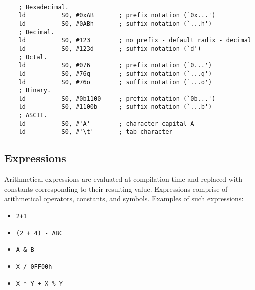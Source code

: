         ~\\
        \verb"    ; Hexadecimal."\\
        \verb"    ld          S0, #0xAB       ; prefix notation (`0x...')"\\
        \verb"    ld          S0, #0ABh       ; suffix notation (`...h')"\\
        \verb"    ; Decimal."\\
        \verb"    ld          S0, #123        ; no prefix - default radix - decimal"\\
        \verb"    ld          S0, #123d       ; suffix notation (`d')"\\
        \verb"    ; Octal."\\
        \verb"    ld          S0, #076        ; prefix notation (`0...')"\\
        \verb"    ld          S0, #76q        ; suffix notation (`...q')"\\
        \verb"    ld          S0, #76o        ; suffix notation (`...o')"\\
        \verb"    ; Binary."\\
        \verb"    ld          S0, #0b1100     ; prefix notation (`0b...')"\\
        \verb"    ld          S0, #1100b      ; suffix notation (`...b')"\\
        \verb"    ; ASCII."\\
        \verb"    ld          S0, #'A'        ; character capital A"\\
        \verb"    ld          S0, #'\t'       ; tab character"

    \subsection{Expressions}
        Arithmetical expressions are evaluated at compilation time and replaced with constants corresponding to their resulting value. Expressions comprise of arithmetical operators, constants, and symbols. Examples of such expressions:

        \begin{itemize}
            \item \texttt{2+1}
            \item \texttt{(2 + 4) - ABC}
            \item \texttt{A \& B}
            \item \texttt{X / 0FF00h}
            \item \texttt{X * Y + X \% Y}
        \end{itemize}

